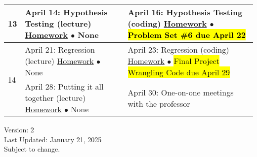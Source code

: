 \documentclass[12pt,letterpaper]{article}
\begin{document}
\begin{tabularx}{\textwidth}{|p{}|p{}||p{}|}

\hline
\multirow{4}{*}{13} &

April 14: Hypothesis Testing (lecture) \newline \newline
\ul{Homework} \newline
$\bullet$ None  &

April 16: Hypothesis Testing (coding) \newline \newline
\ul{Homework} \newline
$\bullet$ \hl{Problem Set \#6 due April 22} \\


\hline
\multirow{5}{*}{14} &

April 21: Regression (lecture) \newline \newline
\ul{Homework} \newline
$\bullet$ None &

April 23: Regression (coding) \newline \newline
\ul{Homework} \newline
$\bullet$ \hl{Final Project Wrangling Code due April 29} \\


\hline
\multirow{4}{*}{15} &

April 28: Putting it all together (lecture) \newline \newline
\ul{Homework} \newline
$\bullet$ None &


April 30: One-on-one meetings with the professor \\

\hline

\end{tabularx}

\centering
Version: 2\\
Last Updated: January 21, 2025\\
Subject to change.
\end{document}
